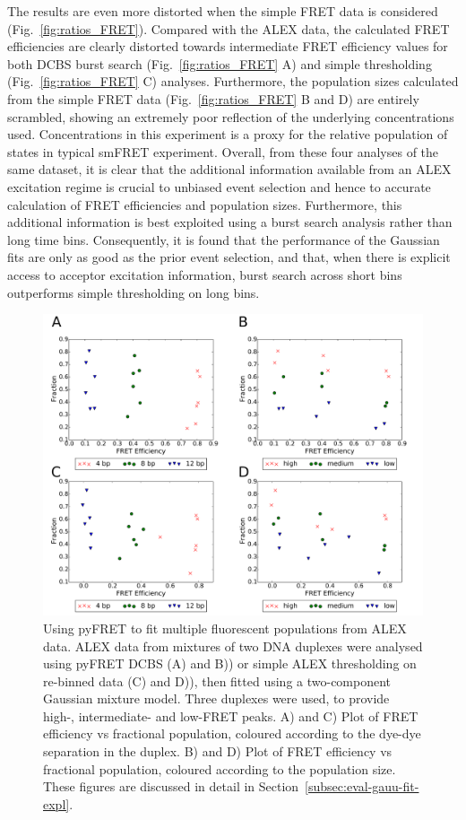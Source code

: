 The results are even more distorted when the simple FRET data is considered (Fig.~\ref{fig:ratios_FRET}). Compared with the ALEX data, the calculated FRET efficiencies are clearly distorted towards intermediate FRET efficiency values for both DCBS burst search (Fig.~\ref{fig:ratios_FRET} A) and simple thresholding (Fig.~\ref{fig:ratios_FRET} C) analyses. Furthermore, the population sizes calculated from the simple FRET data (Fig.~\ref{fig:ratios_FRET} B and D) are entirely scrambled, showing an extremely poor reflection of the underlying concentrations used. Concentrations in this experiment is a proxy for the relative population of states in typical smFRET experiment. Overall, from these four analyses of the same dataset, it is clear that the additional information available from an ALEX excitation regime is crucial to unbiased event selection and hence to accurate calculation of FRET efficiencies and population sizes. Furthermore, this additional information is best exploited using a burst search analysis rather than long time bins. Consequently, it is found that the performance of the Gaussian fits are only as good as the prior event selection, and that, when there is explicit access to acceptor excitation information, burst search across short bins outperforms simple thresholding on long bins.

\begin{figure}[!ht]
   \begin{center}
      \includegraphics*[clip=true, width=6in]{pyFRET/ratios.pdf}
      \caption{Using pyFRET to fit multiple fluorescent populations from ALEX data. ALEX data from mixtures of two DNA duplexes were analysed using pyFRET DCBS (A) and B)) or simple ALEX thresholding on re-binned data (C) and D)), then fitted using a two-component Gaussian mixture model. Three duplexes were used, to provide high-, intermediate- and low-FRET peaks. A) and C) Plot of FRET efficiency vs fractional population, coloured according to the dye-dye separation in the duplex. B) and D) Plot of FRET efficiency vs fractional population, coloured according to the population size. These figures are discussed in detail in Section~\ref{subsec:eval-gauu-fit-expl}.}
      \label{fig:ratios}
   \end{center}
\end{figure}

